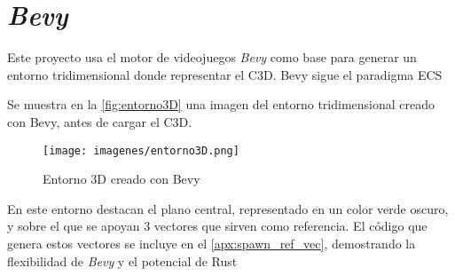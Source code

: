 \section{\textit{Bevy}} \label{sec:bevy}
Este proyecto usa el motor de videojuegos \textit{Bevy} como base para generar un entorno tridimensional donde representar el \ac{C3D}. Bevy sigue el paradigma \ac{ECS} 

Se muestra en la \autoref{fig:entorno3D} una imagen del entorno tridimensional creado con Bevy, antes de cargar el \ac{C3D}.


\begin{figure}[H]
  \centering
  \texttt{[image: imagenes/entorno3D.png]}
  \caption{Entorno 3D creado con Bevy}
  \label{fig:entorno3D}
\end{figure}

En este entorno destacan el plano central, representado en un color verde oscuro, y sobre el que se apoyan 3 vectores que sirven como referencia. El código que genera estos vectores se incluye en el \autoref{apx:spawn_ref_vec}, demostrando la flexibilidad de \textit{Bevy} y el potencial de Rust

